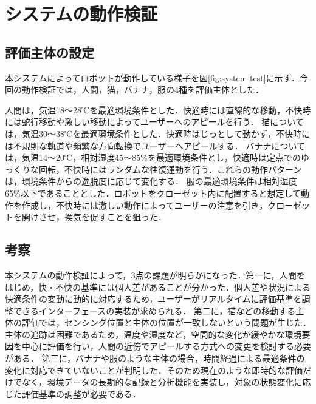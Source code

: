 \documentclass[paper=a4paper,jafontsize=9pt,head_space=15mm,gutter=20mm,
twocolumn,number_of_lines=49, line_length=26zw]{myuarticle}
\begin{document}


\section{システムの動作検証}
\subsection{評価主体の設定}
本システムによってロボットが動作している様子を図\ref{fig:system-test}に示す．今回の動作検証では，人間，猫，バナナ，服の4種を評価主体とした．

人間は，気温18～28℃を最適環境条件とした．快適時には直線的な移動，不快時には蛇行移動や激しい移動によってユーザーへのアピールを行う．
猫については，気温30～38℃\cite{stellaEnvironmentalAspectsDomestic2016}を最適環境条件とした．快適時はじっとして動かず，不快時には不規則な軌道や頻繁な方向転換でユーザーへアピールする．
バナナについては，気温14～20℃，相対湿度45～85\%を最適環境条件とし，快適時は定点でのゆっくりな回転，不快時にはランダムな往復運動を行う．これらの動作パターンは，環境条件からの逸脱度に応じて変化する．
服の最適環境条件は相対湿度65\%以下であることとした．ロボットをクローゼット内に配置すると想定して動作を作成し，不快時には激しい動作によってユーザーの注意を引き，クローゼットを開けさせ，換気を促すことを狙った．

\subsection{考察}

本システムの動作検証によって，3点の課題が明らかになった．第一に，人間をはじめ，快・不快の基準には個人差があることが分かった．個人差や状況による快適条件の変動に動的に対応するため，ユーザーがリアルタイムに評価基準を調整できるインターフェースの実装が求められる．
第二に，猫などの移動する主体の評価では，センシング位置と主体の位置が一致しないという問題が生じた．主体の追跡は困難であるため，温度や湿度など，空間的な変化が緩やかな環境要因を中心に評価を行い，人間の近傍でアピールする方式への変更を検討する必要がある．
第三に，バナナや服のような主体の場合，時間経過による最適条件の変化に対応できていないことが判明した．そのため現在のような即時的な評価だけでなく，環境データの長期的な記録と分析機能を実装し，対象の状態変化に応じた評価基準の調整が必要である．
\end{document}
